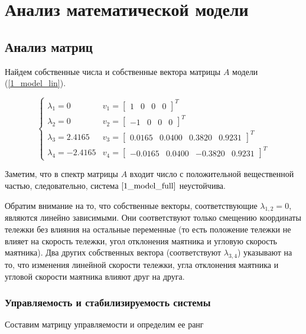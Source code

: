 \chapter{Анализ математической модели}
\label{ch:chap2}

\section{Анализ матриц}
Найдем собственные числа и собственные вектора матрицы $A$ модели (\ref{1_model_lin}).

\begin{equation}
    \begin{cases}
        \lambda_1 = 0 & v_1 = \begin{bmatrix}
            1 & 0 & 0 & 0
        \end{bmatrix}^T\\
         \lambda_2 = 0&  v_2 = \begin{bmatrix}
            -1 & 0 & 0 & 0
        \end{bmatrix}^T\\
         \lambda_3 = 2.4165 & v_3 = \begin{bmatrix}
            0.0165 & 0.0400 & 0.3820 & 0.9231
        \end{bmatrix}^T\\
         \lambda_4 = -2.4165 & v_4 = \begin{bmatrix}
            -0.0165 & 0.0400 & -0.3820 & 0.9231
        \end{bmatrix}^T
    \end{cases}
\end{equation}

Заметим, что в спектр матрицы $A$ входит число с положительной вещественной частью, следовательно, система $\ref{1_model_full}$ неустойчива.

Обратим внимание на то, что собственные векторы, соответствующие $\lambda_{1,2}=0$, являются линейно зависимыми. Они соответствуют только смещению координаты тележки без влияния на остальные переменные (то есть положение тележки не влияет на скорость тележки, угол отклонения маятника и угловую скорость маятника). Два других собственных вектора (соответствуют $\lambda_{3,4}$) указывают на то, что изменения линейной скорости тележки, угла отклонения маятника и угловой скорости маятника влияют друг на друга.

\subsection{Управляемость и стабилизируемость системы}
Составим матрицу управляемости и определим ее ранг

